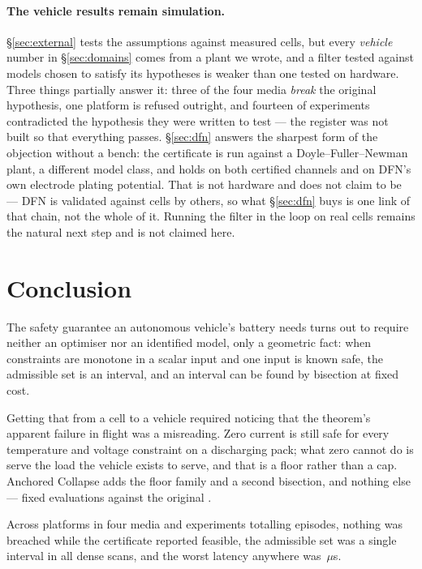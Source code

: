 \documentclass[11pt,letterpaper]{article}
\theoremstyle{definition}
\theoremstyle{remark}
\begin{document}
\paragraph{The vehicle results remain simulation.} \S\ref{sec:external} tests the assumptions
against measured cells, but every \emph{vehicle} number in \S\ref{sec:domains}
comes from a plant we wrote, and a filter tested against models chosen to satisfy its hypotheses
is weaker than one tested on hardware. Three things partially answer it: three of the four media
\emph{break} the original hypothesis, one platform is refused outright, and fourteen of
\vExperiments{} experiments contradicted the hypothesis they were written to test --- the
register was not built so that everything passes. \S\ref{sec:dfn} answers the sharpest form of the objection without a bench: the certificate is
run against a Doyle--Fuller--Newman plant, a different model class, and holds on both certified
channels and on DFN's own electrode plating potential. That is not hardware and does not claim to
be --- DFN is validated against cells by others, so what \S\ref{sec:dfn} buys is one link of that
chain, not the whole of it. Running the filter in the loop on real cells remains the natural next
step and is not claimed here.

\section{Conclusion}

The safety guarantee an autonomous vehicle's battery needs turns out to require neither an
optimiser nor an identified model, only a geometric fact: when constraints are monotone in a
scalar input and one input is known safe, the admissible set is an interval, and an interval can
be found by bisection at fixed cost.

Getting that from a cell to a vehicle required noticing that the theorem's apparent failure in
flight was a misreading. Zero current is still safe for every temperature and voltage constraint
on a discharging pack; what zero cannot do is serve the load the vehicle exists to serve, and
that is a floor rather than a cap. Anchored Collapse adds the floor family and a second
bisection, and nothing else --- \evalDischarge{} fixed evaluations against the original
\evalCharge{}.

Across \vPlatforms{} platforms in four media and \vExperiments{} experiments totalling
\vTotalEpisodes{} episodes, nothing was breached while the certificate reported feasible, the
admissible set was a single interval in all \scanTotal{} dense scans, and the worst latency
anywhere was \worstLatency\,$\mu$s.
\end{document}
